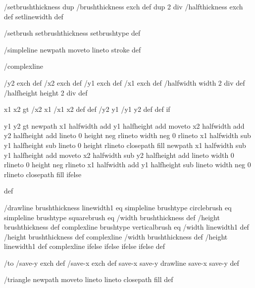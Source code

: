 /setbrushthickness
  { dup /brushthickness exch def
    dup 2 div /halfthickness exch def
    setlinewidth } def

/setbrush { setbrushthickness setbrushtype } def

/simpleline { newpath moveto lineto stroke } def

/complexline
  { /y2 exch def /x2 exch def
    /y1 exch def /x1 exch def
    /halfwidth width 2 div def
    /halfheight height 2 div def

    x1 x2 gt { /x2 x1 /x1 x2 def def /y2 y1 /y1 y2 def def } if

    y1 y2 gt
     { %
       newpath
        x1 halfwidth add y1 halfheight add moveto
	x2 halfwidth add y2 halfheight add lineto
	0 height neg rlineto
        width neg 0 rlineto
        x1 halfwidth sub y1 halfheight sub lineto
        0 height rlineto
        closepath
	fill }
     { %
       newpath
        x1 halfwidth sub y1 halfheight add moveto
	x2 halfwidth sub y2 halfheight add lineto
	width 0 rlineto
	0 height neg rlineto
	x1 halfwidth add y1 halfheight sub lineto
	width neg 0 rlineto
	closepath
	fill }
     ifelse } def

/drawline
  { brushthickness linewidth1 eq
    { simpleline }
    { brushtype circlebrush eq
       { %
         simpleline }
       { brushtype squarebrush eq
          { %
            /width brushthickness def
	    /height brushthickness def
	    complexline }
          { brushtype verticalbrush eq
             { %
	       /width linewidth1 def
	       /height brushthickness def
	       complexline }
             { %
	       /width brushthickness def
	       /height linewidth1 def
	       complexline }
             ifelse }
          ifelse }
       ifelse }
    ifelse } def

/to
 { /save-y exch def
   /save-x exch def
   save-x save-y drawline
   save-x save-y } def

/triangle
 { newpath moveto lineto lineto closepath fill } def

